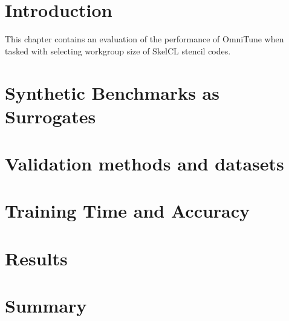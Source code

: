 \section{Introduction}

This chapter contains an evaluation of the performance of OmniTune
when tasked with selecting workgroup size of SkelCL stencil codes.


\section{Synthetic Benchmarks as Surrogates}


\section{Validation methods and datasets}

\section{Training Time and Accuracy}

\section{Results}

\section{Summary}
